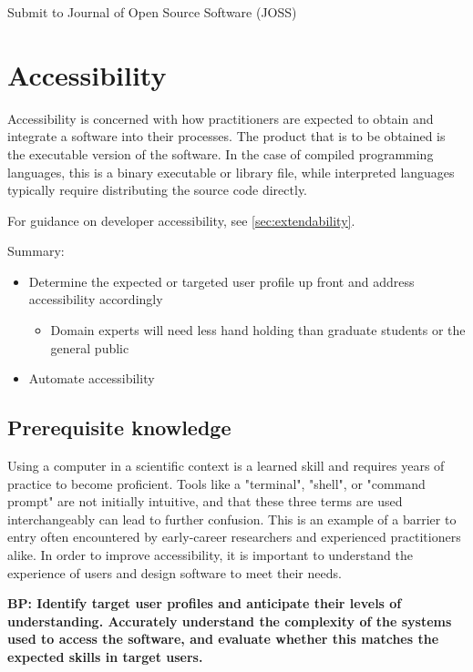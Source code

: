 \documentclass[]{nrel}
\begin{document}
Submit to Journal of Open Source Software (JOSS)


\chapter{Accessibility}
Accessibility is concerned with how practitioners are expected to obtain and integrate a software
into their processes. The product that is to be obtained is the executable version of the software.
In the case of compiled programming languages, this is a binary executable or library file,
while interpreted languages typically require distributing the source code directly.

For guidance on developer accessibility, see \ref{sec:extendability}.

Summary:
\begin{itemize}
\item Determine the expected or targeted user profile up front and address accessibility accordingly
\begin{itemize}
\item Domain experts will need less hand holding than graduate students or the general public

\end{itemize}

\item Automate accessibility

\end{itemize}


\section{Prerequisite knowledge}
Using a computer in a scientific context is a learned skill and requires years of practice to
become proficient. Tools like a "terminal", "shell", or "command prompt" are not initially
intuitive, and that these three terms are used interchangeably can lead to further confusion.
This is an example of a barrier to entry often encountered by early-career researchers and
experienced practitioners alike. In order to improve accessibility, it is important to
understand the experience of users and design software to meet their needs.

\textbf{BP: Identify target user profiles and anticipate their levels of understanding. Accurately
understand the complexity of the systems used to access the software, and evaluate whether
this matches the expected skills in target users.}
\end{document}
